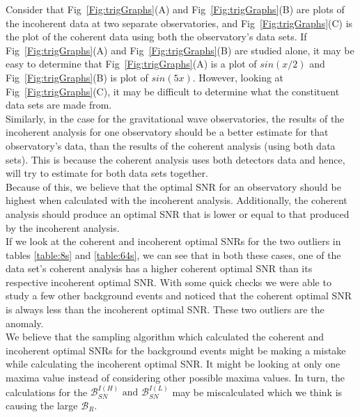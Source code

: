 \documentclass{article}
\begin{document}
Consider that Fig~\ref{Fig:trigGraphs}(A) and Fig~\ref{Fig:trigGraphs}(B) are plots of the incoherent data at two separate observatories, and Fig~\ref{Fig:trigGraphs}(C) is the plot of the coherent data using both the observatory's data sets. If Fig~\ref{Fig:trigGraphs}(A) and Fig~\ref{Fig:trigGraphs}(B) are studied alone, it may be easy to determine that Fig~\ref{Fig:trigGraphs}(A) is a plot of $sin(x/2)$ and Fig~\ref{Fig:trigGraphs}(B) is plot of $sin(5x)$. However, looking at Fig~\ref{Fig:trigGraphs}(C), it may be difficult to determine what the constituent data sets are made from.\\



Similarly, in the case for the gravitational wave observatories, the results of the incoherent analysis for one observatory should be a better estimate for that observatory's data, than the results of the coherent analysis (using both data sets). This is because the coherent analysis uses both detectors data and hence, will try to estimate for both data sets together. \\

Because of this, we believe that the optimal SNR for an observatory should be highest when calculated with the incoherent analysis. Additionally, the coherent analysis should produce an optimal SNR that is lower or equal to that produced by the incoherent analysis.\\

If we look at the coherent and incoherent optimal SNRs for the two outliers in tables \ref{table:8s} and \ref{table:64s}, we can see that in both these cases, one of the data set's coherent analysis has a higher coherent optimal SNR than its respective incoherent optimal SNR. With some quick checks we were able to study a few other background events and noticed that the coherent optimal SNR is always less than the incoherent optimal SNR. These two outliers are the anomaly. \\

We believe that the sampling algorithm which calculated the coherent and incoherent optimal SNRs for the background events might be making a mistake while calculating the incoherent optimal SNR. It might be looking at only one maxima value instead of considering other possible maxima values. In turn, the calculations for the $\mathcal{B}_{SN}^{I(H)}\text{ and }\mathcal{B}_{SN}^{I(L)}$ may be miscalculated which we think is causing the large $\mathcal{B}_{R}$.
 
\end{document}
